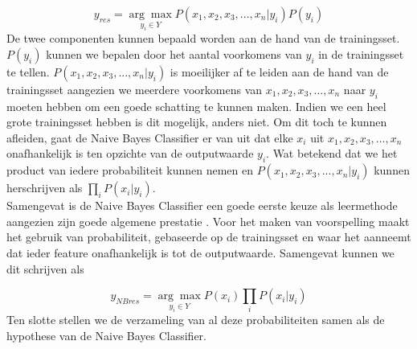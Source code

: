  \[ y_{res} = \underset{y_i \in Y}{\arg\max}P(x_{1},x_{2},x_{3},...,x_{n}|y_i)P(y_i) \]
%
 De twee componenten kunnen bepaald worden aan de hand van de trainingsset. $P(y_i)$ kunnen we bepalen door het aantal voorkomens van $y_i$ in de trainingsset te tellen. $P(x_{1},x_{2},x_{3},...,x_{n}|y_i)$ is moeilijker af te leiden aan de hand van de trainingsset aangezien we meerdere voorkomens van $x_{1},x_{2},x_{3},...,x_{n}$ naar $y_i$ moeten hebben om een goede schatting te kunnen maken.  Indien we een heel grote trainingsset hebben is dit mogelijk, anders niet. Om dit toch te kunnen afleiden, gaat de Naive Bayes Classifier er van uit dat elke $x_i$ uit $x_{1},x_{2},x_{3},...,x_{n}$ onafhankelijk is ten opzichte van de outputwaarde $y_i$. Wat betekend dat we het product van iedere probabiliteit kunnen nemen en $P(x_{1},x_{2},x_{3},...,x_{n}|y_i)$  kunnen herschrijven als $\prod\limits_{i} P(x_{i}|y_{i})$.\\
%
Samengevat is de Naive Bayes Classifier een goede eerste keuze als leermethode aangezien zijn goede algemene prestatie \cite{Michie94machinelearning}. Voor het maken van voorspelling maakt het gebruik van probabiliteit, gebaseerde op de trainingsset en waar het aanneemt dat ieder feature onafhankelijk is tot de outputwaarde. Samengevat kunnen we dit schrijven als

 \[y_{NBres} = \underset{y_i \in Y}{\arg\max} P(x_{i})\prod\limits_{i} P(x_{i}|y_{i}) \]
%
Ten slotte stellen we de verzameling van al deze probabiliteiten samen als de hypothese van de Naive Bayes Classifier.

